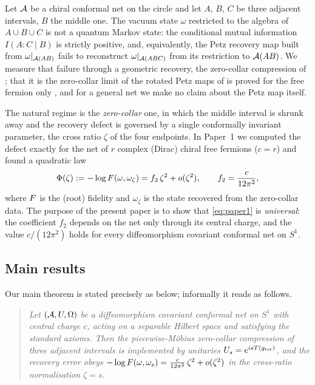 Let $\mathcal A$ be a chiral conformal net on the circle and let $A$, $B$, $C$ be three adjacent
intervals, $B$ the middle one.  The vacuum state $\omega$ restricted to the algebra of
$A\cup B\cup C$ is not a quantum Markov state: the conditional mutual information
$I(A:C\mid B)$ is strictly positive, and, equivalently, the Petz recovery map built from
$\omega|_{\mathcal A(AB)}$ fails to reconstruct $\omega|_{\mathcal A(ABC)}$ from its restriction to
$\mathcal A(AB)$.  We measure that failure through a geometric recovery, the zero-collar compression of ; that it is the zero-collar limit of the rotated Petz maps of \cite{FHSW} is proved for the free fermion only \cite{Paper1}, and for a general net we make no claim about the Petz map itself.

The natural regime is the \emph{zero-collar} one, in which the middle interval is shrunk
away and the recovery defect is governed by a single conformally invariant parameter, the
cross ratio $\zeta$ of the four endpoints.  In Paper~1 \cite{Paper1} we computed the defect
exactly for the net of $r$ complex (Dirac) chiral free fermions ($c=r$) and found a
quadratic law
\begin{equation}\label{eq:paper1}
 \Phi(\zeta):=-\log F(\omega,\omega_\zeta)=f_2\,\zeta^2+o(\zeta^2),
 \qquad f_2=\frac{c}{12\pi^2},
\end{equation}
where $F$ is the (root) fidelity and $\omega_\zeta$ is the state recovered from the
zero-collar data.  The purpose of the present paper is to show that \eqref{eq:paper1} is
\emph{universal}: the coefficient $f_2$ depends on the net only through its central charge,
and the value $c/(12\pi^2)$ holds for every diffeomorphism covariant conformal net on $S^1$.

\subsection*{Main results}

Our main theorem is stated precisely as  below; informally it reads as follows.

\begin{quote}\itshape
Let $(\mathcal A,U,\Omega)$ be a diffeomorphism covariant conformal net on $S^1$ with central
charge $c$, acting on a separable Hilbert space and satisfying the standard axioms.  Then
the piecewise-M\"obius zero-collar compression of three adjacent intervals is implemented
by unitaries $U_s=e^{isT(g_{\rm tot})}$, and the recovery error obeys
$-\log F(\omega,\omega_s)=\frac{c}{12\pi^{2}}\,\zeta^{2}+o(\zeta^{2})$
in the cross-ratio normalisation $\zeta=s$.
\end{quote}

